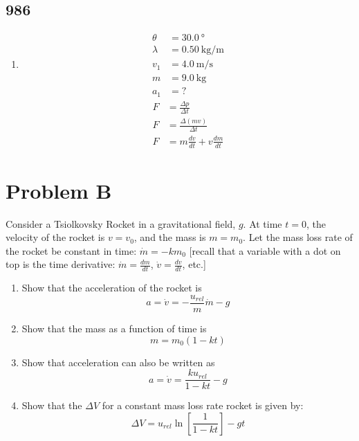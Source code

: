 \documentclass{article}
\begin{document}
\subsection{986}

\begin{enumerate}[label = \textbf{(\alph*)}]
	\item
		\begin{align*}
			\theta & = \SI{30.0}{\degree} \\
			\lambda & = \SI{0.50}{\kilogram \per \meter} \\
			v_1 & = \SI{4.0}{\meter \per \second} \\
			m & = \SI{9.0}{\kilogram} \\
			a_1 & = ?
		\end{align*}
		\begin{align*}
			F & = \frac{ \Delta p }{ \Delta t } \\
			F & = \frac{ \Delta (mv) }{ \Delta t } \\
			F & = m\frac{dv}{dt} + v\frac{dm}{dt}
		\end{align*}
\end{enumerate}

\section{Problem B}

Consider a Tsiolkovsky Rocket in a gravitational field, $ g $. At time $ t = 0 $, the velocity of the rocket is $ v = v_0 $, and the mass is $ m = m_0 $. Let the mass loss rate of the rocket be constant in time: $ \dot{m} = -km_0 $ [recall that a variable with a dot on top is the time derivative: $ \dot{m} = \frac{dm}{dt} $, $ \dot{v} = \frac{dv}{dt} $, etc.]
\begin{enumerate}[label = \textbf{\arabic*.}]
	\item Show that the acceleration of the rocket is
		\begin{equation*}
			a = \dot{v} = -\frac{u_{rel}}{m}\dot{m} - g
		\end{equation*}
	\item Show that the mass as a function of time is
		\begin{equation*}
			m = m_0(1 - kt)
		\end{equation*}
	\item Show that acceleration can also be written as
		\begin{equation*}
			a = \dot{v} = \frac{ku_{rel}}{1 - kt} - g
		\end{equation*}
	\item Show that the $ \Delta V $ for a constant mass loss rate rocket is given by:
		\begin{equation*}
			\Delta V = u_{rel}\ln \left[ \frac{1}{1 - kt} \right] - gt
		\end{equation*}
\end{enumerate}
\end{document}
